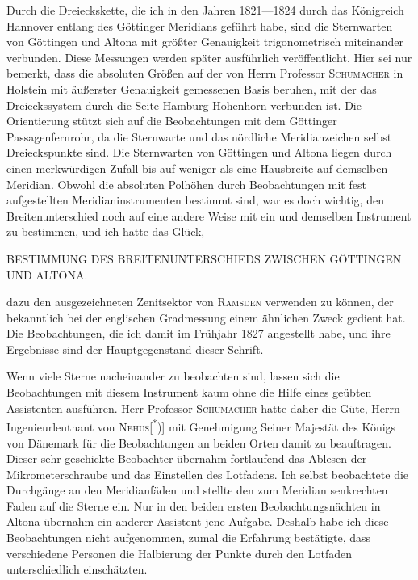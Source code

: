 Durch die Dreieckskette, die ich in den Jahren 1821---1824 durch das Königreich Hannover
entlang des Göttinger Meridians geführt habe, sind die Sternwarten von Göttingen und Altona
mit größter Genauigkeit trigonometrisch miteinander verbunden. Diese Messungen werden
später ausführlich veröffentlicht. Hier sei nur bemerkt, dass die absoluten Größen
auf der von Herrn Professor \textsc{Schumacher} in Holstein mit äußerster Genauigkeit
gemessenen Basis beruhen, mit der das Dreieckssystem durch die Seite Hamburg-Hohenhorn
verbunden ist. Die Orientierung stützt sich auf die Beobachtungen mit dem Göttinger
Passagenfernrohr, da die Sternwarte und das nördliche Meridianzeichen selbst Dreieckspunkte
sind. Die Sternwarten von Göttingen und Altona liegen durch einen merkwürdigen Zufall
bis auf weniger als eine Hausbreite auf demselben Meridian. Obwohl die absoluten Polhöhen
durch Beobachtungen mit fest aufgestellten Meridianinstrumenten bestimmt sind, war es
doch wichtig, den Breitenunterschied noch auf eine andere Weise mit ein und demselben
Instrument zu bestimmen, und ich hatte das Glück,

\clearpage
\noindent{}\parbox[t]{\dimexpr\textwidth-10mm\relax}{\centering\scriptsize BESTIMMUNG DES\,\quotedblbase\,BREITENUNTERSCHIEDS ZWISCHEN GÖTTINGEN UND ALTONA.}\par
\noindent dazu den ausgezeichneten Zenitsektor von \textsc{Ramsden} verwenden zu können,
der bekanntlich bei der englischen Gradmessung einem ähnlichen Zweck gedient hat.
Die Beobachtungen, die ich damit im Frühjahr 1827 angestellt habe, und ihre Ergebnisse
sind der Hauptgegenstand dieser Schrift.

Wenn viele Sterne nacheinander zu beobachten sind, lassen sich die Beobachtungen mit diesem
Instrument kaum ohne die Hilfe eines geübten Assistenten ausführen. Herr Professor
\textsc{Schumacher} hatte daher die Güte, Herrn Ingenieurleutnant von
\textsc{Nehus}[\textsuperscript{*})] mit Genehmigung Seiner Majestät des Königs von Dänemark
für die Beobachtungen an beiden Orten damit zu beauftragen. Dieser sehr geschickte Beobachter
übernahm fortlaufend das Ablesen der Mikrometerschraube und das Einstellen des Lotfadens.
Ich selbst beobachtete die Durchgänge an den Meridianfäden und stellte den zum Meridian
senkrechten Faden auf die Sterne ein. Nur in den beiden ersten Beobachtungsnächten in Altona
übernahm ein anderer Assistent jene Aufgabe. Deshalb habe ich diese Beobachtungen nicht
aufgenommen, zumal die Erfahrung bestätigte, dass verschiedene Personen die Halbierung
der Punkte durch den Lotfaden unterschiedlich einschätzten.

